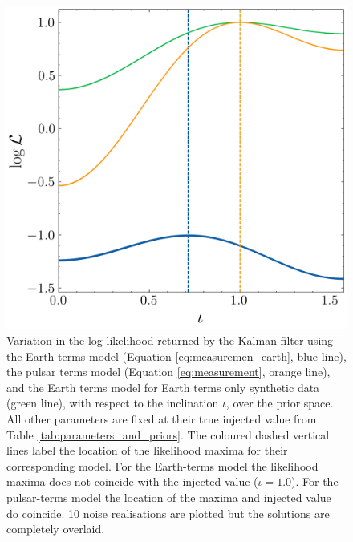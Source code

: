 \documentclass[fleqn,usenatbib,useAMS]{mnras}
\begin{document}
\begin{figure}
	\centering
	\includegraphics[width=\columnwidth]{images/likelihood_iota_new}
	\caption{Variation in the log likelihood returned by the Kalman filter using the Earth terms model (Equation \ref{eq:measuremen_earth}, blue line), the pulsar terms model (Equation \ref{eq:measurement}, orange line), and the Earth terms model for Earth terms only synthetic data (green line), with respect to the inclination $\iota$, over the prior space. All other parameters are fixed at their true injected value from Table \ref{tab:parameters_and_priors}. The coloured dashed vertical lines label the location of the likelihood maxima for their corresponding model. For the Earth-terms model the likelihood maxima does not coincide with the injected value ($\iota = 1.0$). For the pulsar-terms model the location of the maxima and injected value do coincide. 10 noise realisations are plotted but the solutions are completely overlaid.}
	\label{fig:likelihood_surface_iota}
\end{figure}
\end{document}
